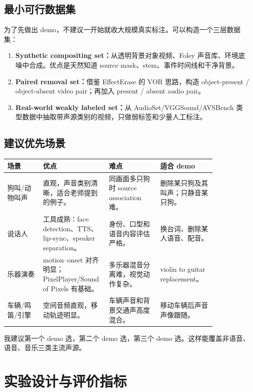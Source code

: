 \subsection{最小可行数据集}

为了先做出 demo，不建议一开始就收大规模真实标注。可以构造一个三层数据集：

\begin{enumerate}[leftmargin=2em]
  \item \textbf{Synthetic compositing set：}从透明背景对象视频、Foley 声音库、环境底噪中合成。优点是天然知道 source mask、stem、事件时间线和干净背景。
  \item \textbf{Paired removal set：}借鉴 EffectErase 的 VOR 思路，构造 object-present / object-absent video pair；再加入 present / absent audio pair。
  \item \textbf{Real-world weakly labeled set：}从 AudioSet/VGGSound/AVSBench 类型数据中抽取带声源类别的视频，只做弱标签和少量人工标注。
\end{enumerate}

\subsection{建议优先场景}

\begin{longtable}{p{0.16\linewidth}p{0.21\linewidth}p{0.23\linewidth}p{0.25\linewidth}}
\toprule
\textbf{场景} & \textbf{优点} & \textbf{难点} & \textbf{适合 demo} \\
\midrule
狗叫/动物叫声 & 直观，声音类别清晰，适合老师提到的例子。 & 同画面多只狗时 source association 难。 & 删除某只狗及其叫声；只静音某只狗。 \\
\midrule
说话人 & 工具成熟：face detection、TTS、lip-sync、speaker separation。 & 身份、口型和语音内容评估严格。 & 换台词、删除某人语音、配音。 \\
\midrule
乐器演奏 & motion--onset 对齐明显；PixelPlayer/Sound of Pixels 有基础。 & 多乐器混音分离难，视觉动作复杂。 & violin to guitar replacement。 \\
\midrule
车辆/鸣笛/引擎 & 空间音频直观，移动轨迹明显。 & 车辆声音和背景交通声高度混合。 & 移动车辆后声音声像跟随。 \\
\bottomrule
\end{longtable}

我建议第一个 demo 选，第二个 demo 选，第三个 demo 选。这样能覆盖非语音、语音、音乐三类主流声源。

\section{实验设计与评价指标}


